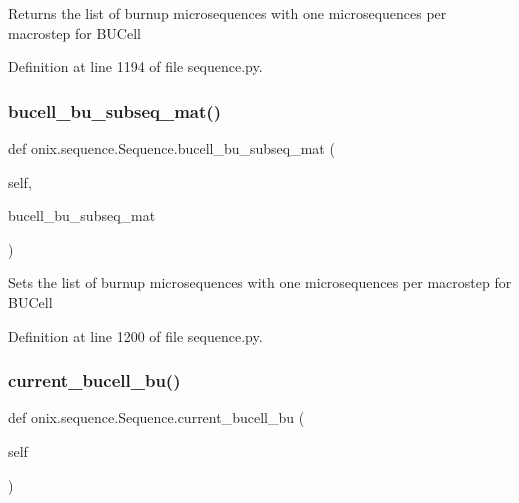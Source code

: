 \begin{DoxyVerb}Returns the list of burnup microsequences with one microsequences per macrostep
for BUCell\end{DoxyVerb}
 

Definition at line 1194 of file sequence.\+py.

\mbox{\label{classonix_1_1sequence_1_1Sequence_a21ed9134f910c51c49e264e4a53db745}} 
\subsubsection{\texorpdfstring{bucell\+\_\+bu\+\_\+subseq\+\_\+mat()}{bucell\_bu\_subseq\_mat()}\hspace{0.1cm}{\footnotesize\ttfamily [2/2]}}
{\footnotesize\ttfamily def onix.\+sequence.\+Sequence.\+bucell\+\_\+bu\+\_\+subseq\+\_\+mat (\begin{DoxyParamCaption}\item[{}]{self,  }\item[{}]{bucell\+\_\+bu\+\_\+subseq\+\_\+mat }\end{DoxyParamCaption})}

\begin{DoxyVerb}Sets the list of burnup microsequences with one microsequences per macrostep
for BUCell\end{DoxyVerb}
 

Definition at line 1200 of file sequence.\+py.

\mbox{\label{classonix_1_1sequence_1_1Sequence_ad4fb0445831abf0eb7bbe1138f09c0b0}} 
\subsubsection{\texorpdfstring{current\+\_\+bucell\+\_\+bu()}{current\_bucell\_bu()}\hspace{0.1cm}{\footnotesize\ttfamily [1/2]}}
{\footnotesize\ttfamily def onix.\+sequence.\+Sequence.\+current\+\_\+bucell\+\_\+bu (\begin{DoxyParamCaption}\item[{}]{self }\end{DoxyParamCaption})}



